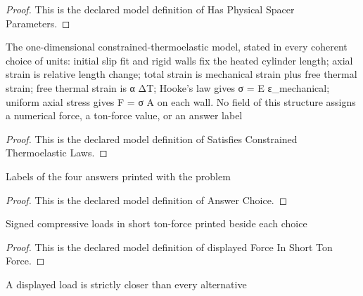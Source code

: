 \begin{proof}
  This is the declared model definition of Has Physical Spacer Parameters.
\end{proof}
\begin{definition}
  \label{def:physics:phyx-mini-0465:phyxminiproblems-problemphyxmini0465-satisfiesconstrainedthermoelasticlaws}
  The one-dimensional constrained-thermoelastic model, stated in every coherent choice of units: initial slip fit and rigid walls fix the heated cylinder length; axial strain is relative length change; total strain is mechanical strain plus free thermal strain; free thermal strain is α ΔT; Hooke's law gives σ = E ε\_mechanical; uniform axial stress gives F = σ A on each wall. No field of this structure assigns a numerical force, a ton-force value, or an answer label
\end{definition}
\begin{proof}
  This is the declared model definition of Satisfies Constrained Thermoelastic Laws.
\end{proof}
\begin{definition}
  \label{def:physics:phyx-mini-0465:phyxminiproblems-problemphyxmini0465-answerchoice}
  Labels of the four answers printed with the problem
\end{definition}
\begin{proof}
  This is the declared model definition of Answer Choice.
\end{proof}
\begin{definition}
  \label{def:physics:phyx-mini-0465:phyxminiproblems-problemphyxmini0465-displayedforceinshorttonforce}
  Signed compressive loads in short ton-force printed beside each choice
\end{definition}
\begin{proof}
  This is the declared model definition of displayed Force In Short Ton Force.
\end{proof}
\begin{definition}
  \label{def:physics:phyx-mini-0465:phyxminiproblems-problemphyxmini0465-isuniqueclosestdisplayedforce}
  A displayed load is strictly closer than every alternative
\end{definition}
